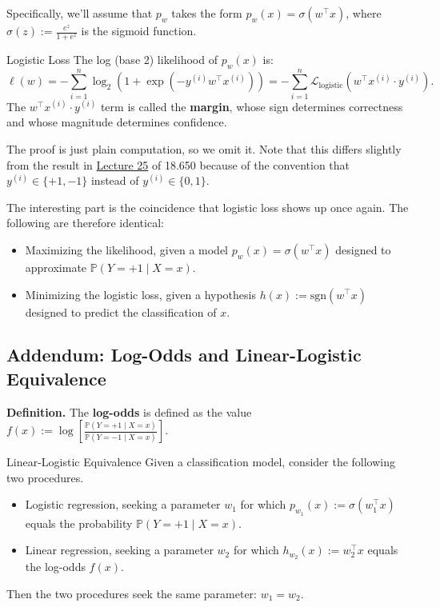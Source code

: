 Specifically, we'll assume that $p_w$ takes the form
$p_w(x) = \sigma\left(w^{\top}x\right)$,
where $\sigma(z) := \frac{e^z}{1 + e^z}$
is the sigmoid function.

\begin{theorem}{Logistic Loss}
    The log (base 2) likelihood of $p_w(x)$ is:
    \[ \ell(w) = -\sum_{i = 1}^n
        \log_2\left(
            1 + \exp\left(-y^{(i)}w^{\top}x^{(i)}\right)
        \right)
    = - \sum_{i = 1}^n \mathcal{L}_{\mathrm{logistic}}\left(
        w^{\top} x^{(i)} \cdot y^{(i)}
    \right). \]
    The $w^{\top}x^{(i)} \cdot y^{(i)}$ term is called
    the \textbf{margin}, whose sign determines correctness
    and whose magnitude determines confidence.
\end{theorem}

The proof is just plain computation, so we omit it.
Note that this differs slightly from the result in
\href{/18.650/lectures/25/#mle-for-logistic-regression}{Lecture 25}
of 18.650 because of the convention that
$y^{(i)} \in \{+1, -1\}$ instead of
$y^{(i)} \in \{0, 1\}$.

The interesting part is the coincidence that
logistic loss shows up once again.
The following are therefore identical:
\begin{itemize}
    \item Maximizing the likelihood, given a model
    $p_w(x) = \sigma(w^{\top}x)$ designed to approximate
    $\mathbb{P}(Y = +1 \mid X = x)$.
    \item Minimizing the logistic loss, given a hypothesis
    $h(x) := \mathrm{sgn}(w^{\top}x)$ designed to
    predict the classification of $x$.
\end{itemize}

\subsection{Addendum: Log-Odds and Linear-Logistic Equivalence}

\textbf{Definition.}
The \textbf{log-odds} is defined as the value
$f(x) := \log \left[
    \frac{\mathbb{P}(Y = +1 \mid X = x)}{\mathbb{P}(Y = -1 \mid X = x)}
\right]$.

\begin{theorem}{Linear-Logistic Equivalence}
    Given a classification model,
    consider the following two procedures.
    \begin{itemize}
        \item Logistic regression,
        seeking a parameter $w_1$ for which
        $p_{w_1}(x) := \sigma(w_1^{\top}x)$
        equals the probability
        $\mathbb{P}(Y = +1 \mid X = x)$.
        \item Linear regression,
        seeking a parameter $w_2$ for which
        $h_{w_2}(x) := w_2^{\top}x$
        equals the log-odds $f(x)$.
    \end{itemize}
    Then the two procedures seek the same parameter: $w_1 = w_2$.
\end{theorem}

